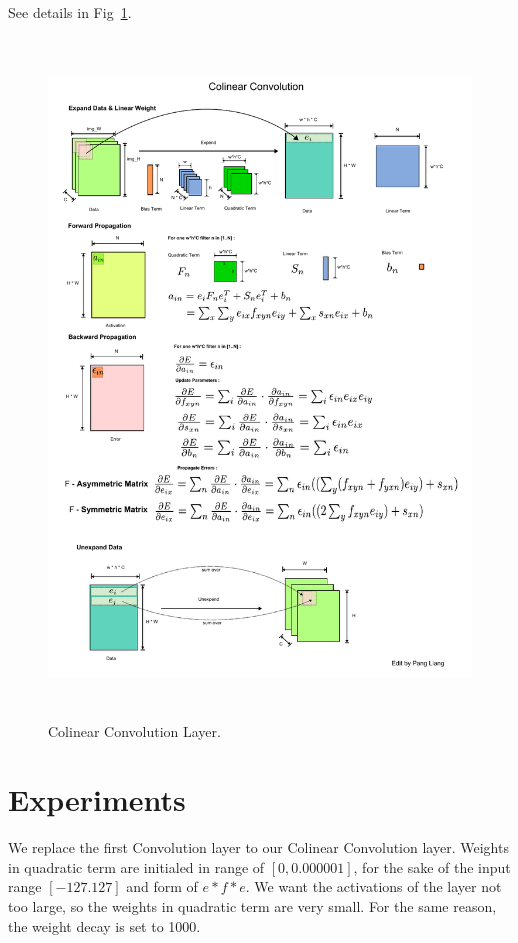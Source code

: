 \documentclass[12pt]{article}
\begin{document}
    See details in Fig~\ref{fig:ccnn}.
    \begin{figure}[!ht]
        \centering
        \includegraphics[height=18cm]{colinearcnn.pdf}
        \caption{\label{fig:ccnn} Colinear Convolution Layer.}
    \end{figure}

\section{Experiments}
We replace the first Convolution layer to our Colinear Convolution layer. Weights in quadratic term are initialed in range of $[0,0.000001]$, for the sake of the input range $[-127. 127]$ and form of $e*f*e$. We want the activations of the layer not too large, so the weights in quadratic term are very small. For the same reason, the weight decay is set to 1000.
\end{document}
